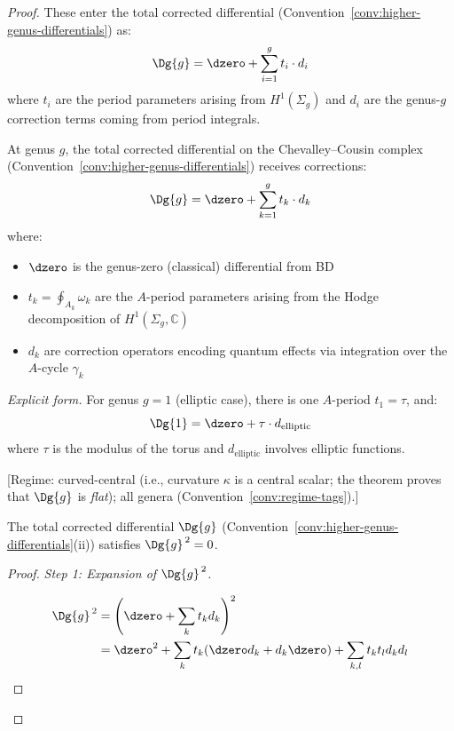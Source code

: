 \begin{proof}
These enter the total corrected differential
(Convention~\ref{conv:higher-genus-differentials}) as:
\[\Dg{g} = \dzero + \sum_{i=1}^g t_i \cdot d_i\]
where $t_i$ are the period parameters arising from $H^1(\Sigma_g)$ and $d_i$ are the
genus-$g$ correction terms coming from period integrals.

\begin{definition}\label{def:quantum-differential}
At genus $g$, the total corrected differential on the Chevalley--Cousin
complex (Convention~\ref{conv:higher-genus-differentials}) receives corrections:
\[\Dg{g} = \dzero + \sum_{k=1}^{g} t_k \cdot d_k\]
where:
\begin{itemize}
\item $\dzero$ is the genus-zero (classical) differential from BD
\item $t_k = \oint_{A_k} \omega_k$ are the $A$-period parameters arising from the Hodge decomposition of $H^1(\Sigma_g, \mathbb{C})$
\item $d_k$ are correction operators encoding quantum effects via integration over the $A$-cycle $\gamma_k$
\end{itemize}

\emph{Explicit form.} For genus $g=1$ (elliptic case), there is one $A$-period $t_1 = \tau$, and:
\[\Dg{1} = \dzero + \tau \cdot d_{\text{elliptic}}\]
where $\tau$ is the modulus of the torus and $d_{\text{elliptic}}$ involves elliptic functions.
\end{definition}

\begin{theorem}[Key property: \texorpdfstring{$\Dg{g}^{\,2} = 0$}{D(g) squared = 0}; \ClaimStatusConditional]\label{thm:quantum-diff-squares-zero}
\textup{[Regime: curved-central
\textup{(}i.e., curvature $\kappa$ is a central scalar;
the theorem proves that $\Dg{g}$ is \emph{flat}\/\textup{)};
all genera
\textup{(}Convention~\textup{\ref{conv:regime-tags})}.]}

The total corrected differential $\Dg{g}$ \textup{(}Convention~\textup{\ref{conv:higher-genus-differentials}(ii))} satisfies $\Dg{g}^{\,2} = 0$.
\end{theorem}

\begin{proof}
\emph{Step 1: Expansion of $\Dg{g}^{\,2}$.}

\begin{align*}
\Dg{g}^{\,2} &= \left(\dzero + \sum_k t_k d_k\right)^2 \\
&= \dzero^2 + \sum_k t_k (\dzero d_k + d_k \dzero) + \sum_{k,l} t_k t_l d_k d_l
\end{align*}


\end{proof}
\end{proof}
